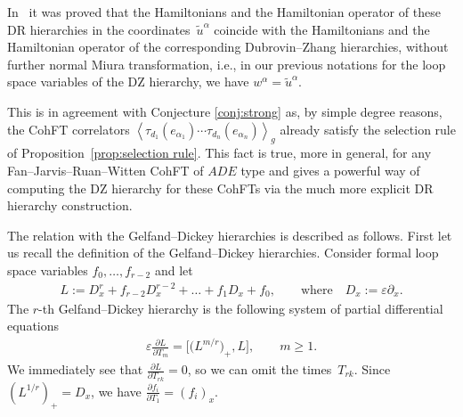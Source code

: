 \documentclass[pdftex]{sigma}
\numberwithin{equation}{section}
\newcommand{\tu}{{\widetilde u}}
\def\d{{\partial}}
\newcommand{\<}{\left<}
\renewcommand{\>}{\right>}
\newcommand{\eps}{\varepsilon}
\begin{document}
In~\cite{BG15} it was proved that the Hamiltonians and the Hamiltonian operator of these DR hierarchies in the coordinates~$\tu^\alpha$ coincide with the Hamiltonians and the Hamiltonian operator of the corresponding Dubrovin--Zhang hierarchies, without further normal Miura transformation, i.e., in our previous notations for the loop space variables of the DZ hierarchy, we have $w^\alpha=\tu^\alpha$.

This is in agreement with Conjecture \ref{conj:strong} as, by simple degree reasons, the CohFT correlators
$\<\tau_{d_1}(e_{\alpha_1})\cdots\tau_{d_n}(e_{\alpha_n})\>_g$ already satisfy the selection rule of Proposition~\ref{prop:selection rule}. This fact is true, more in general, for any Fan--Jarvis--Ruan--Witten CohFT of $ADE$ type and gives a powerful way of computing the DZ hierarchy for these CohFTs via the much more explicit DR hierarchy construction.

The relation with the Gelfand--Dickey hierarchies is described as follows. First let us recall the def\/inition of the Gelfand--Dickey hierarchies. Consider formal loop space variables $f_0,\dots,f_{r-2}$ and let
\begin{gather*}
L:=D_x^r+f_{r-2}D_x^{r-2}+\dots+f_1D_x+f_0, \qquad \text{where}\quad D_x:=\eps \d_x.
\end{gather*}
The $r$-th Gelfand--Dickey hierarchy is the following system of partial dif\/ferential equations
\begin{gather}\label{eq:GD hierarchy}
\eps\frac{\d L}{\d T_m}=\big[\big(L^{m/r}\big)_+,L\big],\qquad m\ge 1.
\end{gather}
We immediately see that $\frac{\d L}{\d T_{rk}}=0$, so we can omit the times~$T_{rk}$. Since $(L^{1/r})_+=D_x$, we have $\frac{\d f_i}{\d T_1}=(f_i)_x$.
\end{document}
